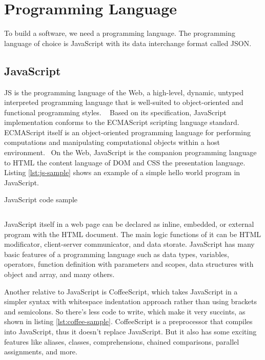 \section{Programming Language}
\label{sec:programming}

To build a software, we need a programming language.
The programming language of choice is JavaScript with its data interchange format called JSON.

\subsection{JavaScript}

\ac{JS} is the programming language of the Web, a high-level, dynamic, untyped interpreted programming language that is well-suited to object-oriented and functional programming styles.
~\autocite{Flanagan:2011:JS}
Based on its specification, JavaScript implementation conforms to the ECMAScript\textsuperscript{\textregistered} scripting language standard.
ECMAScript itself is an object-oriented programming language for performing computations and manipulating computational objects within a host environment.~\autocite{ECMA:2011:ECMAScript}
On the Web, JavaScript is the companion programming language to \ac{HTML} the content language of \ac{DOM} and \ac{CSS} the presentation language.
Listing \autoref{lst:js-sample} shows an example of a simple hello world program in JavaScript.

\begin{listing}[ht]
\caption{JavaScript code sample}
\inputminted{javascript}{\dir/include/js-sample.js}
\label{lst:js-sample}
\end{listing}

JavaScript itself in a web page can be declared as inline, embedded, or external program with the \ac{HTML} document.
The main logic functions of it can be \ac{HTML} modificator, client-server communicator, and data storate.
JavaScript has many basic features of a programming language such as data types, variables, operators, function definition with parameters and scopes, data structures with object and array, and many others.

Another relative to JavaScript is CoffeeScript, which takes JavaScript in a simpler syntax with whitespace indentation approach rather than using brackets and semicolons.
So there's less code to write, which make it very succints, as shown in listing \autoref{lst:coffee-sample}.
CoffeeScript is a preprocessor that compiles into JavaScript, thus it doesn't replace JavaScript.
But it also has some exciting features like aliases, classes, comprehensions, chained comparisons, parallel assignments, and more.

